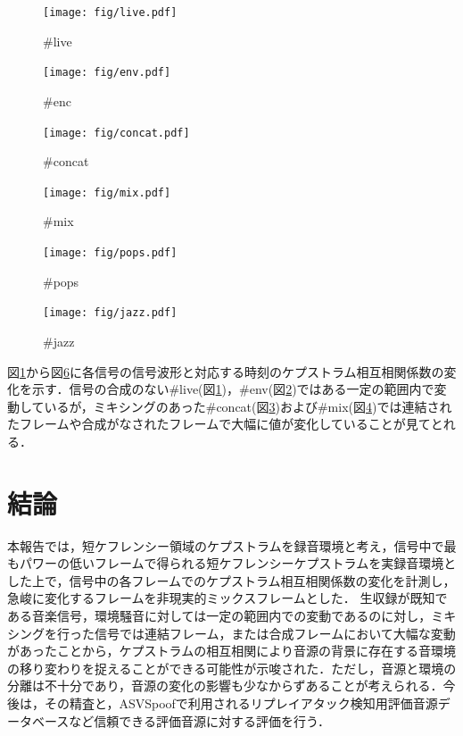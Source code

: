 \documentclass[technicalreport]{ieicej}
\begin{document}
\begin{figure}
	\centering
	\texttt{[image: fig/live.pdf]}
	\caption{\#live}
	\label{fig:result_live}
\end{figure}
\begin{figure}
	\centering
	\texttt{[image: fig/env.pdf]}
	\caption{\#enc}
	\label{fig:result_env}
\end{figure}
\begin{figure}
	\centering
	\texttt{[image: fig/concat.pdf]}
	\caption{\#concat}
	\label{fig:result_concat}
\end{figure}
\begin{figure}
	\centering
	\texttt{[image: fig/mix.pdf]}
	\caption{\#mix}
	\label{fig:result_mix}
\end{figure}
\begin{figure}
	\centering
	\texttt{[image: fig/pops.pdf]}
	\caption{\#pops}
	\label{fig:result_pops}
\end{figure}
\begin{figure}
	\centering
	\texttt{[image: fig/jazz.pdf]}
	\caption{\#jazz}
	\label{fig:result_jazz}
\end{figure}

図\ref{fig:result_live}から図\ref{fig:result_jazz}に各信号の信号波形と対応する時刻のケプストラム相互相関係数の変化を示す．信号の合成のない\#live(図\ref{fig:result_live})，\#env(図\ref{fig:result_env})ではある一定の範囲内で変動しているが，ミキシングのあった\#concat(図\ref{fig:result_concat})および\#mix(図\ref{fig:result_mix})では連結されたフレームや合成がなされたフレームで大幅に値が変化していることが見てとれる．




\section{結論}
本報告では，短ケフレンシー領域のケプストラムを録音環境と考え，信号中で最もパワーの低いフレームで得られる短ケフレンシーケプストラムを実録音環境とした上で，信号中の各フレームでのケプストラム相互相関係数の変化を計測し，急峻に変化するフレームを非現実的ミックスフレームとした．
生収録が既知である音楽信号，環境騒音に対しては一定の範囲内での変動であるのに対し，ミキシングを行った信号では連結フレーム，または合成フレームにおいて大幅な変動があったことから，ケプストラムの相互相関により音源の背景に存在する音環境の移り変わりを捉えることができる可能性が示唆された．ただし，音源と環境の分離は不十分であり，音源の変化の影響も少なからずあることが考えられる．今後は，その精査と，ASVSpoofで利用されるリプレイアタック検知用評価音源データベースなど信頼できる評価音源に対する評価を行う．



\end{document}
